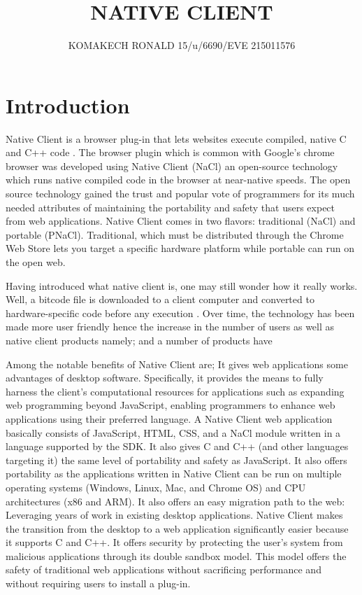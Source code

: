 \documentclass {article}
\begin{document}
\title{ NATIVE CLIENT}
\author{KOMAKECH RONALD 15/u/6690/EVE 215011576}

\maketitle

\section{Introduction}
Native Client is a browser plug-in that lets websites execute compiled, native C and C++ code \cite{r1} . The browser plugin which is common with Google’s chrome browser \cite{r6} was developed using Native Client (NaCl) an open-source technology which runs native compiled code in the browser at near-native speeds. The open source technology gained the trust and popular vote of programmers for its much needed attributes of maintaining the portability and safety \cite{r7} that users expect from web applications. Native Client comes in two flavors: traditional (NaCl) and portable (PNaCl). Traditional, which must be distributed through the Chrome Web Store lets you target a specific hardware platform while portable can run on the open web. 
\par
Having introduced what native client is, one may still wonder how it really works. Well, a bitcode file is downloaded to a client computer and converted to hardware-specific code before any execution \cite{r2}. Over time, the technology has been made more user friendly hence the increase in the number of users as well as native client products namely; and a number of products have 

\par
Among the notable benefits of Native Client are;\newline
It gives web applications some advantages of desktop software. Specifically, it provides the means to fully harness the client’s computational resources for applications such as expanding web programming beyond JavaScript, enabling programmers to enhance web applications using their preferred language. A Native Client web application basically consists of JavaScript, HTML, CSS, and a NaCl module written in a language supported by the SDK.\newline
It also gives C and C++ (and other languages targeting it) the same level of portability and safety as JavaScript.\newline
It also offers portability as the applications written in Native Client can be run on multiple operating systems (Windows, Linux, Mac, and Chrome OS) and CPU architectures (x86 and ARM).\newline
It also offers an easy migration path to the web: Leveraging years of work in existing desktop applications. Native Client makes the transition from the desktop to a web application significantly easier because it supports C and C++.\newline
It offers security by protecting the user’s system from malicious applications through its double sandbox model. This model offers the safety of traditional web applications without sacrificing performance and without requiring users to install a plug-in.
\end{document}
